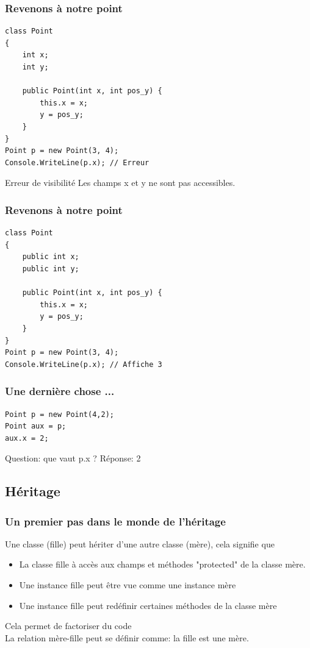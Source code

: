 \documentclass{beamer}
\begin{document}
\begin{frame}[fragile]
\frametitle{Revenons à notre point}
\begin{lstlisting}
class Point
{
    int x;
    int y;

    public Point(int x, int pos_y) {
        this.x = x;
        y = pos_y;
    }
}
Point p = new Point(3, 4);
Console.WriteLine(p.x); // Erreur
\end{lstlisting}
\begin{alertblock}{Erreur de visibilité}
Les champs x et y ne sont pas accessibles.
\end{alertblock}
\end{frame}

\begin{frame}[fragile]
\frametitle{Revenons à notre point}
\begin{lstlisting}
class Point
{
    public int x;
    public int y;
    
    public Point(int x, int pos_y) {
        this.x = x;
        y = pos_y;
    }
}
Point p = new Point(3, 4);
Console.WriteLine(p.x); // Affiche 3
\end{lstlisting}
\end{frame}

\begin{frame}[fragile]
\frametitle{Une dernière chose ...}
\begin{lstlisting}
Point p = new Point(4,2);
Point aux = p;
aux.x = 2;
\end{lstlisting}
Question: que vaut p.x ? 
\pause
Réponse: 2
\end{frame}

\subsection{Héritage}
\begin{frame}
\frametitle{Un premier pas dans le monde de l'héritage}
Une classe (fille) peut hériter d'une autre classe (mère), cela signifie que
\begin{itemize}
\item La classe fille à accès aux champs et méthodes "protected" de la classe mère.
\item Une instance fille peut être vue comme une instance mère
\item Une instance fille peut redéfinir certaines méthodes de la classe mère
\end{itemize}
\pause
Cela permet de factoriser du code\\
\pause
La relation mère-fille peut se définir comme: la fille est une mère.
\end{frame}
\end{document}
